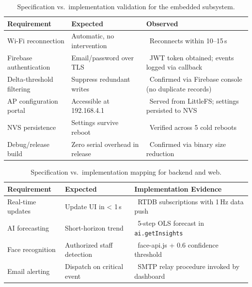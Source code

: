 \begin{table}[H]
	\centering
	\caption{Specification vs.\ implementation validation for the embedded subsystem.}
	\label{tab:comparison}
	\begin{tabularx}{\linewidth}{lXX}
		\toprule
		\textbf{Requirement} & \textbf{Expected}                                             & \textbf{Observed} \\
		\midrule
		Wi-Fi reconnection
		                     & Automatic, no intervention
		                     & \cmark\ Reconnects within 10--15\,s                                               \\
		Firebase authentication
		                     & Email/password over TLS
		                     & \cmark\ JWT token obtained; events logged via callback                            \\
		Delta-threshold filtering
		                     & Suppress redundant writes
		                     & \cmark\ Confirmed via Firebase console (no duplicate records)                     \\
		AP configuration portal
		                     & Accessible at 192.168.4.1
		                     & \cmark\ Served from LittleFS; settings persisted to NVS                           \\
		NVS persistence
		                     & Settings survive reboot
		                     & \cmark\ Verified across 5 cold reboots                                            \\
		Debug/release build
		                     & Zero serial overhead in release
		                     & \cmark\ Confirmed via binary size reduction                                       \\
		\bottomrule
	\end{tabularx}
\end{table}

\begin{table}[H]
	\centering
	\caption{Specification vs.\ implementation mapping for backend and web.}
	\label{tab:comparison_full}
	\begin{tabularx}{\linewidth}{lXX}
		\toprule
		\textbf{Requirement} & \textbf{Expected} & \textbf{Implementation Evidence} \\
		\midrule
		Real-time updates & Update UI in < 1\,s & \cmark\ RTDB subscriptions with 1\,Hz data push \\
		AI forecasting & Short-horizon trend & \cmark\ 5-step OLS forecast in \texttt{ai.getInsights} \\
		Face recognition & Authorized staff detection & \cmark\ face-api.js\cite{faceapi} + 0.6 confidence threshold \\
		Email alerting & Dispatch on critical event & \cmark\ SMTP relay procedure invoked by dashboard \\
		\bottomrule
	\end{tabularx}
\end{table}

